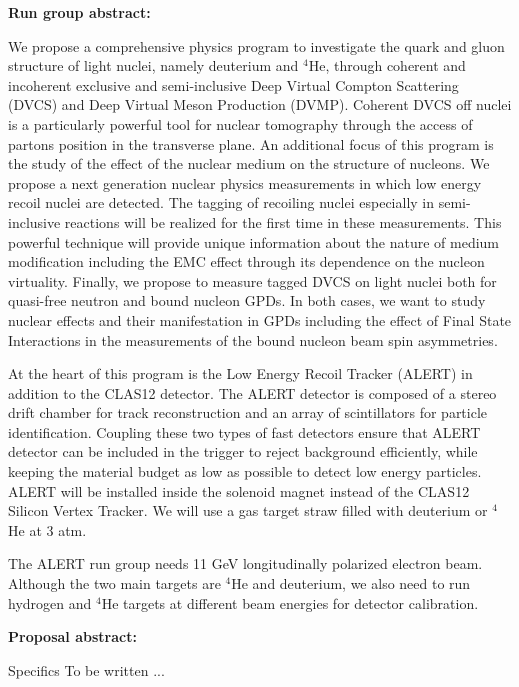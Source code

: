 {\large\textbf{Run group abstract:}}
\newline

We propose a comprehensive physics program to investigate the quark and
gluon structure of light nuclei, namely deuterium and $^4$He, through coherent and
incoherent exclusive and semi-inclusive Deep Virtual Compton Scattering (DVCS) and
Deep Virtual Meson Production (DVMP). Coherent DVCS off nuclei is a particularly
powerful tool for nuclear tomography through the access of partons position in the
transverse plane. An additional focus of this program is the study of the effect of the
nuclear medium on the structure of nucleons. We propose a next generation nuclear
physics measurements in which low energy recoil nuclei are detected. The tagging of
recoiling nuclei especially in semi-inclusive reactions will be realized for the first time in
these measurements. This powerful technique will provide unique information about the
nature of medium modification including the EMC effect through its dependence on the
nucleon virtuality. Finally, we propose to measure tagged DVCS on light nuclei both for
quasi-free neutron and bound nucleon GPDs. In both cases, we want to study nuclear
effects and their manifestation in GPDs including the effect of Final State Interactions in
the measurements of the bound nucleon beam spin asymmetries.

At the heart of this program is the Low Energy Recoil Tracker (ALERT) in addition
to the CLAS12 detector. The ALERT detector is composed of a stereo drift chamber for
track reconstruction and an array of scintillators for particle identification. Coupling these
two types of fast detectors ensure that ALERT detector can be included in the trigger to
reject background efficiently, while keeping the material budget as low as possible to
detect low energy particles. ALERT will be installed inside the solenoid magnet instead
of the CLAS12 Silicon Vertex Tracker. We will use a gas target straw filled with
deuterium or $^4$He at 3 atm.

The ALERT run group needs 11 GeV longitudinally polarized electron beam.
Although the two main targets are $^4$He and deuterium, we also need to run hydrogen and
$^4$He targets at different beam energies for detector calibration.

\newpage
{\large\textbf{Proposal abstract:}}
\newline

Specifics To be written ...

\newpage

